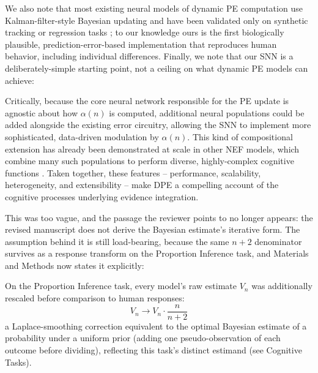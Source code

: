 We also note that most existing neural models of dynamic PE computation use Kalman-filter-style Bayesian updating and have been validated only on synthetic tracking or regression tasks \citep{millidge2021neural, adamiat2025spiking}; to our knowledge ours is the first biologically plausible, prediction-error-based implementation that reproduces human behavior, including individual differences. Finally, we note that our SNN is a deliberately-simple starting point, not a ceiling on what dynamic PE models can achieve:
\begin{ms}
Critically, because the core neural network responsible for the PE update is agnostic about how $\alpha(n)$ is computed, additional neural populations could be added alongside the existing error circuitry, allowing the SNN to implement more sophisticated, data-driven modulation by $\alpha(n)$. This kind of compositional extension has already been demonstrated at scale in other NEF models, which combine many such populations to perform diverse, highly-complex cognitive functions \citep{choo2018spaun, dumont2023biologically}. Taken together, these features -- performance, scalability, heterogeneity, and extensibility -- make DPE a compelling account of the cognitive processes underlying evidence integration.
\end{ms}


This was too vague, and the passage the reviewer points to no longer appears: the revised manuscript does not derive the Bayesian estimate's iterative form. The assumption behind it is still load-bearing, because the same $n+2$ denominator survives as a response transform on the Proportion Inference task, and Materials and Methods now states it explicitly:

\begin{ms}
On the Proportion Inference task, every model's raw estimate $V_n$ was additionally rescaled before comparison to human responses:
\[
	V_n \to V_n \cdot \frac{n}{n+2}
\]
a Laplace-smoothing correction equivalent to the optimal Bayesian estimate of a probability under a uniform prior (adding one pseudo-observation of each outcome before dividing), reflecting this task's distinct estimand (see Cognitive Tasks).
\end{ms}

